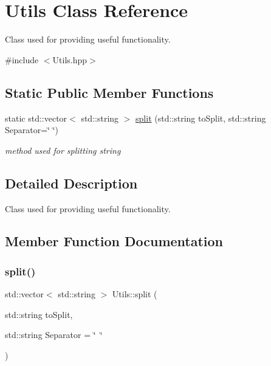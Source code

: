 \hypertarget{class_utils}{}\section{Utils Class Reference}
\label{class_utils}


Class used for providing useful functionality.  




{\ttfamily \#include $<$Utils.\+hpp$>$}

\subsection*{Static Public Member Functions}
\begin{DoxyCompactItemize}
\item 
static std\+::vector$<$ std\+::string $>$ \mbox{\hyperlink{class_utils_a4b340ceb0cae184c4d42237716284b1b}{split}} (std\+::string to\+Split, std\+::string Separator=\char`\"{} \char`\"{})
\begin{DoxyCompactList}\small\item\em method used for splitting string \end{DoxyCompactList}\end{DoxyCompactItemize}


\subsection{Detailed Description}
Class used for providing useful functionality. 

\subsection{Member Function Documentation}
\mbox{\label{class_utils_a4b340ceb0cae184c4d42237716284b1b}} 
\subsubsection{\texorpdfstring{split()}{split()}}
{\footnotesize\ttfamily std\+::vector$<$ std\+::string $>$ Utils\+::split (\begin{DoxyParamCaption}\item[{std\+::string}]{to\+Split,  }\item[{std\+::string}]{Separator = {\ttfamily \char`\"{}~\char`\"{}} }\end{DoxyParamCaption})\hspace{0.3cm}{\ttfamily [static]}}



